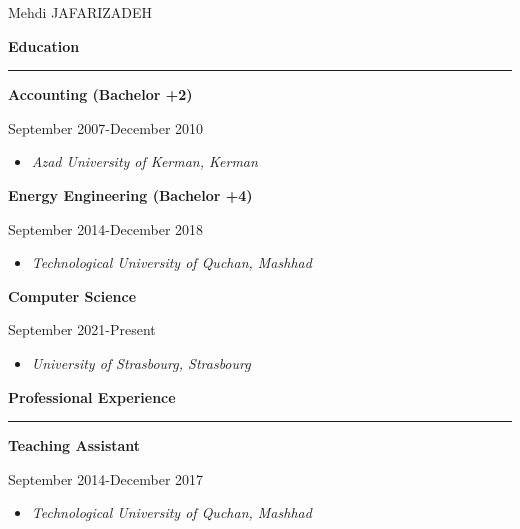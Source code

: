 \documentclass{letter}
\newcommand{\divider}{\rule{\linewidth}{0.9pt}}
\begin{document}
\hfill
\begin{minipage}[t]{0.60\textwidth}


\setlength{\baselineskip}{1.5\baselineskip}
\vspace{0.7cm}

{\huge Mehdi JAFARIZADEH}

\vspace{1cm}


{\large \textbf{Education}}
\divider

{ \textbf{Accounting (Bachelor +2)}}

{\footnotesize September 2007-December 2010}
\begin{itemize}
    \footnotesize \item \textit{Azad University of Kerman, Kerman}
\end{itemize}

\vspace{3mm}

{ \textbf{Energy Engineering (Bachelor +4)}}

{\footnotesize September 2014-December 2018}
\begin{itemize}
    \footnotesize \item \textit{Technological University of Quchan, Mashhad}
\end{itemize}

\vspace{3mm}

{\textbf{Computer Science}}

{\footnotesize September 2021-Present}
\begin{itemize}
    \footnotesize \item \textit{University of Strasbourg, Strasbourg}
\end{itemize}

\vspace{0.8cm}


{\large \textbf{Professional Experience}}
\divider

{ \textbf{Teaching Assistant}}

{ \footnotesize September 2014-December 2017}
\begin{itemize}
    \footnotesize \item \textit{Technological University of Quchan, Mashhad}
\end{itemize}


\end{minipage}
\end{document}
